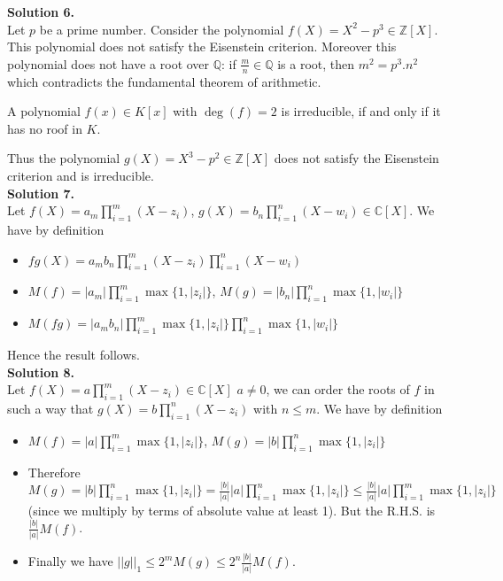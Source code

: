 \documentclass[12pt,a4paper]{article}
\begin{document}
\textbf{Solution 6. }\\

Let $p$ be a prime number. Consider the polynomial $f(X)=X^2-p^3\in\mathbb{Z}[X]$. This polynomial does not satisfy the Eisenstein criterion. Moreover this polynomial does not have a root over $\mathbb{Q}$: if $\frac{m}{n}\in \mathbb{Q}$ is a root, then $m^2=p^3.n^2$ which contradicts the fundamental theorem of arithmetic.

A polynomial $f(x) ∈ K[x]$ with $\deg(f) = 2$ is irreducible, if and only if it has no roof in $K$. 

Thus the polynomial $g(X)=X^3-p^2\in\mathbb{Z}[X]$ does not satisfy the Eisenstein criterion and is irreducible.  \\

\textbf{Solution 7. }\\

Let $f(X)=a_m\prod_{i=1}^{m}(X-z_i)$, $g(X)=b_n\prod_{i=1}^{n}(X-w_i)\in \mathbb{C}[X]$. We have by definition

\begin{itemize}
    \item $fg(X)=a_mb_n\prod_{i=1}^{m}(X-z_i)\prod_{i=1}^{n}(X-w_i)$
    \item $M(f)=|a_m|\prod_{i=1}^{m} \max \{1, |z_i|\}$, $M(g)=|b_n|\prod_{i=1}^{n} \max \{1, |w_i|\}$
    \item $M(fg)=|a_mb_n|\prod_{i=1}^{m} \max \{1, |z_i|\}\prod_{i=1}^{n} \max \{1, |w_i|\}$
\end{itemize}{}

Hence the result follows. \\

\textbf{Solution 8. }\\

Let $f(X)=a\prod_{i=1}^{m}(X-z_i)\in\mathbb{C}[X]$ $a\neq 0$, we can order the roots of $f$ in such a way that $g(X)=b\prod_{i=1}^{n}(X-z_i)$ with $n\leq m$. We have by definition

\begin{itemize}
    \item $M(f)=|a|\prod_{i=1}^{m} \max \{1, |z_i|\}$, $M(g)=|b|\prod_{i=1}^{n} \max \{1, |z_i|\}$
    \item Therefore $M(g)=|b|\prod_{i=1}^{n} \max \{1, |z_i|\}=\frac{|b|}{|a|}|a|\prod_{i=1}^{n} \max \{1, |z_i|\}\leq \frac{|b|}{|a|}|a|\prod_{i=1}^{m} \max \{1, |z_i|\} $ (since we multiply by terms of absolute value at least 1). But the R.H.S. is $\frac{|b|}{|a|}M(f)$.
    \item Finally we have $||g||_1\leq 2^m M(g)\leq 2^n \frac{|b|}{|a|}M(f)$.  
\end{itemize}{}
\end{document}
